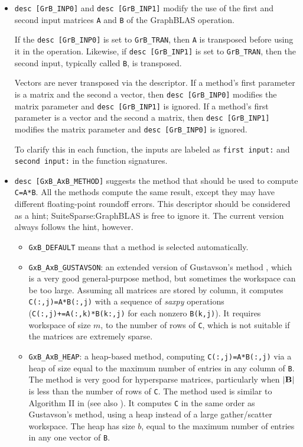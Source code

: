 \documentclass[12pt]{article}
\begin{document}
\begin{itemize}
\item \verb'desc [GrB_INP0]' and \verb'desc [GrB_INP1]' modify the use of the
    first and second input matrices \verb'A' and \verb'B' of the GraphBLAS
    operation.

    If the \verb'desc [GrB_INP0]' is set to \verb'GrB_TRAN', then \verb'A' is
    transposed before using it in the operation.  Likewise, if
    \verb'desc [GrB_INP1]' is set to \verb'GrB_TRAN', then the second input,
    typically called \verb'B', is transposed.

    Vectors are never transposed via the descriptor.  If a method's first
    parameter is a matrix and the second a vector, then \verb'desc [GrB_INP0]'
    modifies the matrix parameter and \verb'desc [GrB_INP1]' is ignored.  If a
    method's first parameter is a vector and the second a matrix, then
    \verb'desc [GrB_INP1]' modifies the matrix parameter and
    \verb'desc [GrB_INP0]' is ignored.

    To clarify this in each function, the inputs are labeled as
    \verb'first input:' and \verb'second input:' in the function signatures.

\item \verb'desc [GxB_AxB_METHOD]' suggests the method that should be
    used to compute \verb'C=A*B'.  All the methods compute the same result,
    except they may have different floating-point roundoff errors.  This
    descriptor should be considered as a hint; SuiteSparse:GraphBLAS is
    free to ignore it.  The current version always follows the hint, however.

    \begin{itemize}

    \item \verb'GxB_DEFAULT' means that a method is selected automatically.

    \item \verb'GxB_AxB_GUSTAVSON':  an extended version of Gustavson's method
    \cite{Gustavson78}, which is a very good general-purpose method, but
    sometimes the workspace can be too large.  Assuming all matrices are stored
    by column, it computes \verb'C(:,j)=A*B(:,j)' with a sequence of {\em
    saxpy} operations (\verb'C(:,j)+=A(:,k)*B(k:,j)' for each nonzero
    \verb'B(k,j)').  It requires workspace of size $m$, to the number of rows
    of \verb'C', which is not suitable if the matrices are extremely sparse.

    \item \verb'GxB_AxB_HEAP': a heap-based method, computing
    \verb'C(:,j)=A*B(:,j)' via a heap of size equal to the maximum number of
    entries in any column of \verb'B'.  The method is very good for hypersparse
    matrices, particularly when $|{\bf B}|$ is less than the number of rows of
    \verb'C'.  The method used is similar to Algorithm II in
    \cite{BulucGilbert08} (see also \cite{BulucGilbert12}).  It computes
    \verb'C' in the same order as Gustavson's method, using a heap instead of a
    large gather/scatter workspace.  The heap has size $b$, equal to the
    maximum number of entries in any one vector of \verb'B'.


\end{itemize}
\end{itemize}
\end{document}
